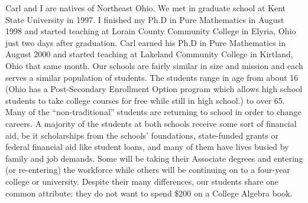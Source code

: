 \noindent Carl and I are natives of Northeast Ohio.  We met in graduate school at Kent State University in 1997.  I finished my Ph.D in Pure Mathematics in August 1998 and started teaching at Lorain County Community College in Elyria, Ohio just two days after graduation.  Carl earned his Ph.D in Pure Mathematics in August 2000 and started teaching at Lakeland Community College in Kirtland, Ohio that same month.  Our schools are fairly similar in size and mission and each serves a similar population of students.  The students range in age from about 16 (Ohio has a Post-Secondary Enrollment Option program which allows high school students to take college courses for free while still in high school.) to over 65.  Many of the ``non-traditional'' students are returning to school in order to change careers.  A majority of the students at both schools receive some sort of financial aid, be it scholarships from the schools' foundations, state-funded grants or federal financial aid like student loans, and many of them have lives busied by family and job demands.  Some will be taking their Associate degrees and entering (or re-entering) the workforce while others will be continuing on to a four-year college or university.  Despite their many differences, our students share one common attribute: they do not want to spend \$200 on a College Algebra book.

\medskip

